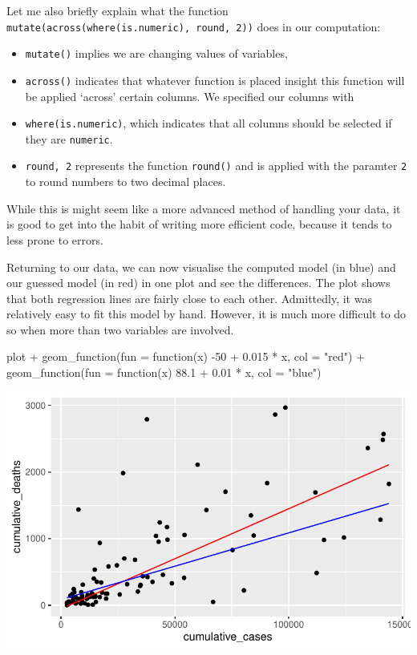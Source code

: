 \documentclass[
  letterpaper,
]{krantz}
\makeatletter
\newenvironment{Shaded}{\begin{snugshade}}{\end{snugshade}}
\newcommand{\AttributeTok}[1]{\textcolor[rgb]{0.40,0.45,0.13}{#1}}
\newcommand{\ControlFlowTok}[1]{\textcolor[rgb]{0.00,0.23,0.31}{#1}}
\newcommand{\DecValTok}[1]{\textcolor[rgb]{0.68,0.00,0.00}{#1}}
\newcommand{\FloatTok}[1]{\textcolor[rgb]{0.68,0.00,0.00}{#1}}
\newcommand{\FunctionTok}[1]{\textcolor[rgb]{0.28,0.35,0.67}{#1}}
\newcommand{\NormalTok}[1]{\textcolor[rgb]{0.00,0.23,0.31}{#1}}
\newcommand{\SpecialCharTok}[1]{\textcolor[rgb]{0.37,0.37,0.37}{#1}}
\newcommand{\StringTok}[1]{\textcolor[rgb]{0.13,0.47,0.30}{#1}}
\newenvironment{kframe}{%
\medskip{}
\setlength{\fboxsep}{.8em}
 \def\at@end@of@kframe{}%
 \ifinner\ifhmode%
  \def\at@end@of@kframe{\end{minipage}}%
  \begin{minipage}{\columnwidth}%
 \fi\fi%
 \def\FrameCommand##1{\hskip\@totalleftmargin \hskip-\fboxsep
 \colorbox{shadecolor}{##1}\hskip-\fboxsep
     \hskip-\linewidth \hskip-\@totalleftmargin \hskip\columnwidth}%
 \MakeFramed {\advance\hsize-\width
   \@totalleftmargin\z@ \linewidth\hsize
   \@setminipage}}%
 {\par\unskip\endMakeFramed%
 \at@end@of@kframe}
\renewenvironment{Shaded}{\begin{kframe}}{\end{kframe}}
\makeatother
\begin{document}
Let me also briefly explain what the function
\texttt{mutate(across(where(is.numeric),\ round,\ 2))} does in our
computation:

\begin{itemize}
\item
  \texttt{mutate()} implies we are changing values of variables,
\item
  \texttt{across()} indicates that whatever function is placed insight
  this function will be applied `across' certain columns. We specified
  our columns with
\item
  \texttt{where(is.numeric)}, which indicates that all columns should be
  selected if they are \texttt{numeric}.
\item
  \texttt{round,\ 2} represents the function \texttt{round()} and is
  applied with the paramter \texttt{2} to round numbers to two decimal
  places.
\end{itemize}

While this is might seem like a more advanced method of handling your
data, it is good to get into the habit of writing more efficient code,
because it tends to less prone to errors.

Returning to our data, we can now visualise the computed model (in blue)
and our guessed model (in red) in one plot and see the differences. The
plot shows that both regression lines are fairly close to each other.
Admittedly, it was relatively easy to fit this model by hand. However,
it is much more difficult to do so when more than two variables are
involved.

\begin{Shaded}
\begin{Highlighting}[]
\NormalTok{plot }\SpecialCharTok{+}
  \FunctionTok{geom\_function}\NormalTok{(}\AttributeTok{fun =} \ControlFlowTok{function}\NormalTok{(x) }\SpecialCharTok{{-}}\DecValTok{50} \SpecialCharTok{+} \FloatTok{0.015} \SpecialCharTok{*}\NormalTok{ x, }\AttributeTok{col =} \StringTok{"red"}\NormalTok{) }\SpecialCharTok{+}
    \FunctionTok{geom\_function}\NormalTok{(}\AttributeTok{fun =} \ControlFlowTok{function}\NormalTok{(x) }\FloatTok{88.1} \SpecialCharTok{+} \FloatTok{0.01} \SpecialCharTok{*}\NormalTok{ x, }\AttributeTok{col =} \StringTok{"blue"}\NormalTok{)}
\end{Highlighting}
\end{Shaded}

\includegraphics{13_regressions_files/figure-pdf/comparing-computed-vs-hand-fitted-1.pdf}
\end{document}
